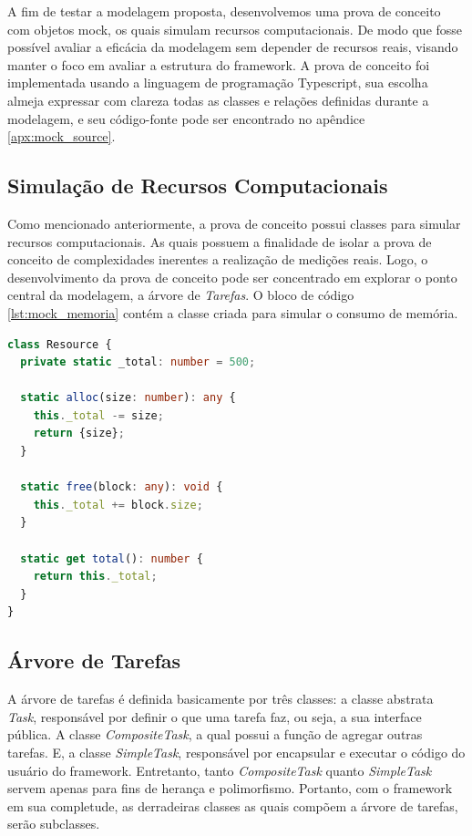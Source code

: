 \documentclass[12pt]{tcc}
\begin{document}
A fim de testar a modelagem proposta, desenvolvemos uma prova de conceito com objetos mock, os quais simulam recursos computacionais.
De modo que fosse possível avaliar a eficácia da modelagem sem depender de recursos reais, visando manter o foco em avaliar a estrutura do framework.
A prova de conceito foi implementada usando a linguagem de programação Typescript, sua escolha almeja expressar com clareza todas as classes e relações definidas durante a modelagem, e seu código-fonte pode ser encontrado no apêndice \ref{apx:mock_source}.


\subsection{Simulação de Recursos Computacionais}
Como mencionado anteriormente, a prova de conceito possui classes para simular recursos computacionais.
As quais possuem a finalidade de isolar a prova de conceito de complexidades inerentes a realização de medições reais.
Logo, o desenvolvimento da prova de conceito pode ser concentrado em explorar o ponto central da modelagem, a árvore de \emph{Tarefas}.
O bloco de código \ref{lst:mock_memoria} contém a classe criada para simular o consumo de memória.

\begin{lstlisting}[label={lst:mock_memoria}, caption={[Implementação de uma classe que representa recursos de memória usada na prova de conceito.]Implementação da classe responsável por simular recursos de memória para a prova de conceito do framework.}, language=TypeScript]
class Resource {
  private static _total: number = 500;

  static alloc(size: number): any {
    this._total -= size;
    return {size};
  }

  static free(block: any): void {
    this._total += block.size;
  }

  static get total(): number {
    return this._total;
  }
}
\end{lstlisting}


\subsection{Árvore de Tarefas}
\label{task-tree}

A árvore de tarefas é definida basicamente por três classes:
a classe abstrata \emph{Task}, responsável por definir o que uma tarefa faz, ou seja, a sua interface pública.
A classe \emph{CompositeTask}, a qual possui a função de agregar outras tarefas.
E, a classe \emph{SimpleTask}, responsável por encapsular e executar o código do usuário do framework.
Entretanto, tanto \emph{CompositeTask} quanto \emph{SimpleTask} servem apenas para fins de herança e polimorfismo.
Portanto, com o framework em sua completude, as derradeiras classes as quais compõem a árvore de tarefas, serão subclasses.
\end{document}
